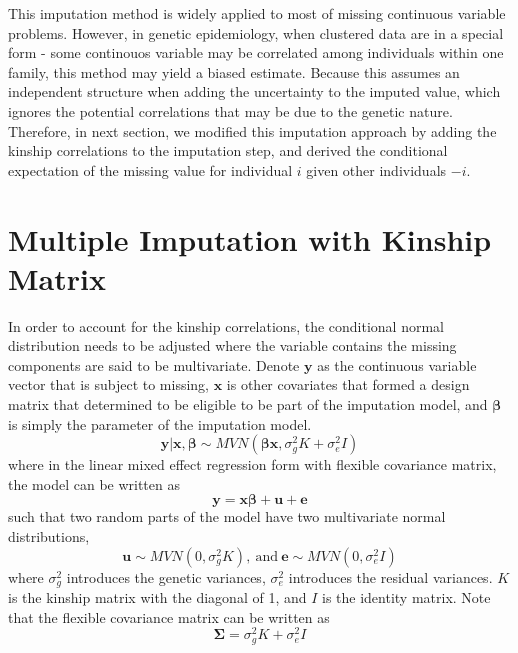 This imputation method is widely applied to most of missing continuous variable problems. 
However, in genetic epidemiology, when clustered data are in a special form - some continouos variable may be correlated among individuals within one family, this method may yield a biased estimate. 
Because this assumes an independent structure when adding the uncertainty to the imputed value, which ignores the potential correlations that may be due to the genetic nature. 
Therefore, in next section, we modified this imputation approach by adding the kinship correlations to the imputation step, and derived the conditional expectation of the missing value for individual $i$ given other individuals $-i$. 

\section{Multiple Imputation with Kinship Matrix}
\raggedbottom
In order to account for the kinship correlations, the conditional normal distribution needs to be adjusted where the variable contains the missing components are said to be multivariate. 
Denote $\mathbf{y}$ as the continuous variable vector that is subject to missing, $\mathbf{x}$ is other covariates that formed a design matrix that determined to be eligible to be part of the imputation model, and $\boldsymbol{\beta}$ is simply the parameter of the imputation model.
\begin{equation} 
    \mathbf{y}|\mathbf{x},\boldsymbol{\beta}\sim MVN(\boldsymbol{\beta}\mathbf{x}, \sigma_g^2K+\sigma_e^2I)
\end{equation}
where in the linear mixed effect regression form with flexible covariance matrix, the model can be written as 
\begin{equation} 
    \mathbf{y}=\mathbf{x}\boldsymbol{\beta}+\mathbf{u}+\mathbf{e}
\end{equation}
such that two random parts of the model have two multivariate normal distributions,
\begin{equation*}
    \mathbf{u}\sim MVN(0,\sigma_g^2K),~ \text{and}~ \mathbf{e}\sim MVN(0,\sigma_e^2I)
\end{equation*}
where $\sigma_g^2$ introduces the genetic variances, $\sigma_e^2$ introduces the residual variances. 
$K$ is the kinship matrix with the diagonal of 1, and $I$ is the identity matrix. 
Note that the flexible covariance matrix can be written as 
\begin{equation}
    \boldsymbol{\Sigma}=\sigma_g^2K+\sigma_e^2I
\end{equation}
